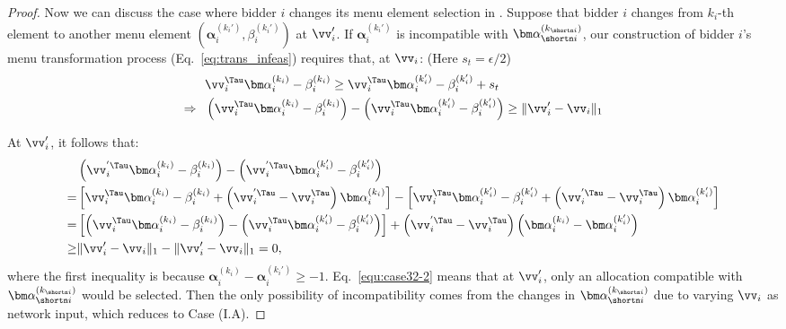 \begin{proof}

Now we can discuss the case where bidder $i$ changes its menu element selection in \neighbor. Suppose that bidder $i$ changes from $k_i$-th element to another menu element $(\bm\alpha_i^{(k_i')}, \beta_i^{(k_i')})$ at $\vv_i'$. If $\bm\alpha_i^{(k_i')}$ is incompatible with $\bm\alpha_{\shortn i}^{(k_{\shortn i})}$, our construction of bidder $i$'s menu transformation process (Eq.~\ref{eq:trans_infeas}) requires that, at $\vv_i$: (Here $s_t=\epsilon/2$)
\begin{align}
    &\vv_i^\Tau \bm\alpha_i^{(k_i)} - \beta_i^{(k_i)} \ge \vv_i^\Tau \bm\alpha_i^{(k_i')} - \beta_i^{(k_i')} + s_t\nonumber \\
    \Rightarrow\ \ & \left(\vv_i^{\Tau} \bm\alpha_i^{(k_i)} - \beta_i^{(k_i)}\right) - \left(\vv_i^{\Tau} \bm\alpha_i^{(k_i')} - \beta_i^{(k_i')}\right) \ge \|\vv_i'-\vv_i\|_1\label{equ:case32-1}
\end{align}


At $\vv_i'$, it follows that:
\begin{align}
    & \left(\vv_i^{'\Tau} \bm\alpha_i^{(k_i)} - \beta_i^{(k_i)}\right) - \left(\vv_i^{'\Tau} \bm\alpha_i^{(k_i')} - \beta_i^{(k_i')}\right) \nonumber\\
    = & \left[\vv_i^{\Tau} \bm\alpha_i^{(k_i)} - \beta_i^{(k_i)} + \left(\vv_i^{'\Tau}-\vv_i^{\Tau} \right)\bm\alpha_i^{(k_i)}\right] - \left[\vv_i^{\Tau} \bm\alpha_i^{(k_i')} - \beta_i^{(k_i')} + \left(\vv_i^{'\Tau}-\vv_i^{\Tau} \right)\bm\alpha_i^{(k_i')}\right]\nonumber\\
    = & \left[\left(\vv_i^{\Tau} \bm\alpha_i^{(k_i)} - \beta_i^{(k_i)}\right) - \left(\vv_i^{\Tau} \bm\alpha_i^{(k_i')} - \beta_i^{(k_i')}\right)\right] + \left(\vv_i^{'\Tau}-\vv_i^{\Tau} \right)\left(\bm\alpha_i^{(k_i)}-\bm\alpha_i^{(k_i')}\right) \nonumber\\
    \ge & \|\vv_i'-\vv_i\|_1 -  \|\vv_i'-\vv_i\|_1 = 0, \label{equ:case32-2}
\end{align}
where the first inequality is because $\bm\alpha_i^{(k_i)}-\bm\alpha_i^{(k_i')}\ge -1$. Eq.~\ref{equ:case32-2} means that at $\vv_i'$, only an allocation compatible with $\bm\alpha_{\shortn i}^{(k_{\shortn i})}$ would be selected. Then the only possibility of incompatibility comes from the changes in $\bm\alpha_{\shortn i}^{(k_{\shortn i})}$ due to varying $\vv_i$ as network input, which reduces to Case (I.A).


\end{proof}
